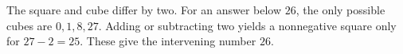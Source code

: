 The square and cube differ by two. For an answer below $26$, the only possible cubes are $0,1,8,27$. Adding or subtracting two yields a nonnegative square only for $27-2=25$. These give the intervening number $\boxed{26}$.
